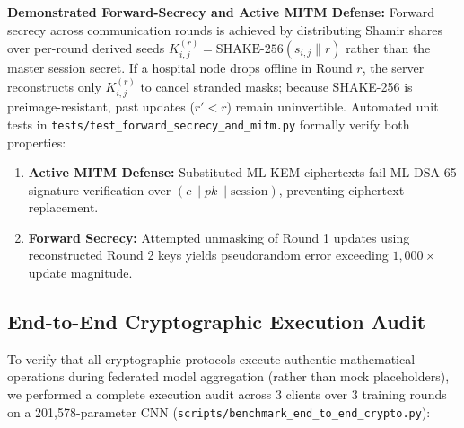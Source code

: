 \documentclass[11pt,a4paper]{article}
\begin{document}
\noindent\textbf{Demonstrated Forward-Secrecy and Active MITM Defense:} Forward secrecy across communication rounds is achieved by distributing Shamir shares over per-round derived seeds $K_{i,j}^{(r)} = \text{SHAKE-256}(s_{i,j} \parallel r)$ rather than the master session secret. If a hospital node drops offline in Round $r$, the server reconstructs only $K_{i,j}^{(r)}$ to cancel stranded masks; because SHAKE-256 is preimage-resistant, past updates ($r' < r$) remain uninvertible. Automated unit tests in \lstinline|tests/test_forward_secrecy_and_mitm.py| formally verify both properties:
\begin{enumerate}[itemsep=1pt]
  \item \textbf{Active MITM Defense:} Substituted ML-KEM ciphertexts fail ML-DSA-65 signature verification over $(c \parallel pk \parallel \text{session})$, preventing ciphertext replacement.
  \item \textbf{Forward Secrecy:} Attempted unmasking of Round 1 updates using reconstructed Round 2 keys yields pseudorandom error exceeding $1{,}000\times$ update magnitude.
\end{enumerate}

\subsection{End-to-End Cryptographic Execution Audit}
To verify that all cryptographic protocols execute authentic mathematical operations during federated model aggregation (rather than mock placeholders), we performed a complete execution audit across 3 clients over 3 training rounds on a 201{,}578-parameter CNN (\lstinline|scripts/benchmark_end_to_end_crypto.py|):
\end{document}
